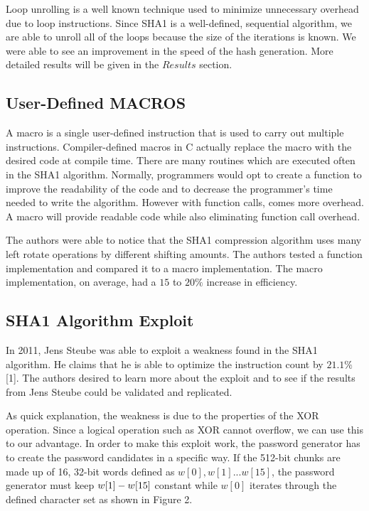 \documentclass[letterpaper, 10 pt, conference]{ieeeconf}  %
\begin{document}
Loop unrolling is a well known technique used to minimize unnecessary overhead due to loop instructions.  Since SHA1 is a well-defined, sequential algorithm, we are able to unroll all of the loops because the size of the iterations is known.  We were able to see an improvement in the speed of the hash generation.  More detailed results will be given in the $Results$ section.   

\subsection{User-Defined MACROS}

A macro is a single user-defined instruction that is used to carry out multiple instructions.  Compiler-defined macros in C actually replace the macro with the desired code at compile time.  There are many routines which are executed often in the SHA1 algorithm.  Normally, programmers would opt to create a function to improve the readability of the code and to decrease the programmer's time needed to write the algorithm.  However with function calls, comes more overhead.  A macro will provide readable code while also eliminating function call overhead.

The authors were able to notice that the SHA1 compression algorithm uses many left rotate operations by different shifting amounts.  The authors tested a function implementation and compared it to a macro implementation.  The macro implementation, on average, had a $15$ to $20\%$ increase in efficiency.     

\subsection{SHA1 Algorithm Exploit}

In 2011, Jens Steube was able to exploit a weakness found in the SHA1 algorithm. He claims that he is able to optimize the instruction count by $21.1\%$ [1].  The authors desired to learn more about the exploit and to see if the results from Jens Steube could be validated and replicated.

As quick explanation, the weakness is due to the properties of the XOR operation.  Since a logical operation such as XOR cannot overflow, we can use this to our advantage.  In order to make this exploit work, the password generator has to create the password candidates in a specific way.  If the 512-bit chunks are made up of 16, 32-bit words defined as $w[0],w[1]...w[15]$, the password generator must keep $w[1] \-- w[15]$ constant while $w[0]$ iterates through the defined character set as shown in Figure 2.
\end{document}
